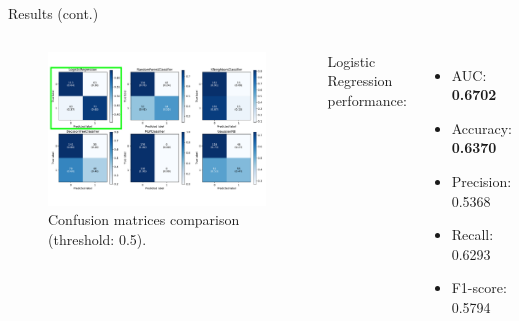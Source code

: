 \documentclass[aspectratio=169,xcolor=dvipsnames,handout]{beamer}
\begin{document}


\begin{frame}{Results (cont.)}

    \begin{columns}[c]

        \begin{figure}[htpb]
            \centering
            \includegraphics[width=\textwidth]{confusion_matrices_annot_green}
            \caption{Confusion matrices comparison (threshold: 0.5).}
        \end{figure}
        
    
        Logistic Regression performance:
        \begin{itemize}
            \item AUC: \textbf{0.6702}
            \item Accuracy: \textbf{0.6370}
            \item Precision: 0.5368
            \item Recall: 0.6293
            \item F1-score: 0.5794
        \end{itemize}
        



\end{columns}
\end{frame}
\end{document}
